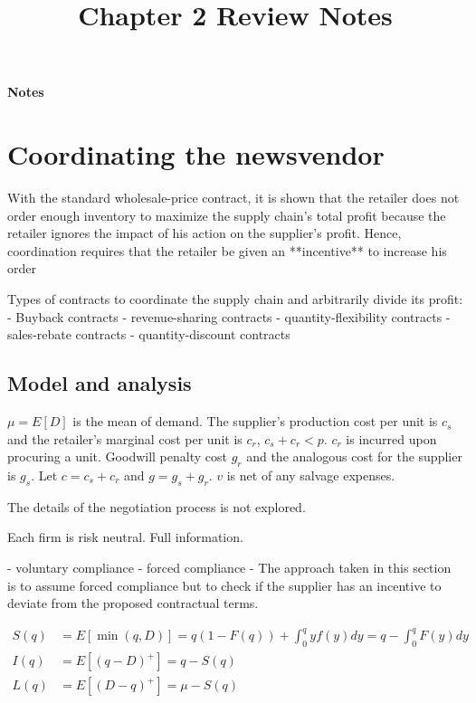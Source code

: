 \setcounter{section}{1}

\title{Chapter 2 Review Notes}

\thispagestyle{empty}

\begin{center}
{\LARGE \bf Notes}\\
\end{center}


\section{Coordinating the newsvendor}

With the standard wholesale-price contract, it is shown that the retailer does not order enough inventory to maximize the supply chain’s total profit because the retailer ignores the impact of his action on the supplier’s profit. Hence, coordination requires that the retailer be given an **incentive** to increase his order

Types of contracts to coordinate the supply chain and arbitrarily divide its profit:
- Buyback contracts
- revenue-sharing contracts
- quantity-flexibility contracts 
- sales-rebate contracts
- quantity-discount contracts


\subsection{Model and analysis}
$\mu=E[D]$ is the mean of demand. The supplier's production cost per unit is $c_s$ and the retailer's marginal cost per unit is $c_r$, $c_s+c_r<p$. $c_r$ is incurred upon procuring a unit. Goodwill penalty cost $g_r$ and the analogous cost for the supplier is $g_s$. Let $c=c_s+c_r$ and $g=g_s+g_r$. $v$ is net of any salvage expenses. 

The details of the negotiation process is not explored.

Each firm is risk neutral. Full information.

- voluntary compliance
- forced compliance
- The approach taken in this section is to assume forced compliance but to check if the supplier has an incentive to deviate from the proposed contractual terms.


\begin{align*}
    S(q)&=E[\min(q,D)]=q(1-F(q))+\int_0^q y f(y)dy=q-\int_0^q F(y)dy\\
    I(q)&=E[(q-D)^+]=q-S(q)\\
    L(q)&=E[(D-q)^+]=\mu-S(q)
\end{align*}

